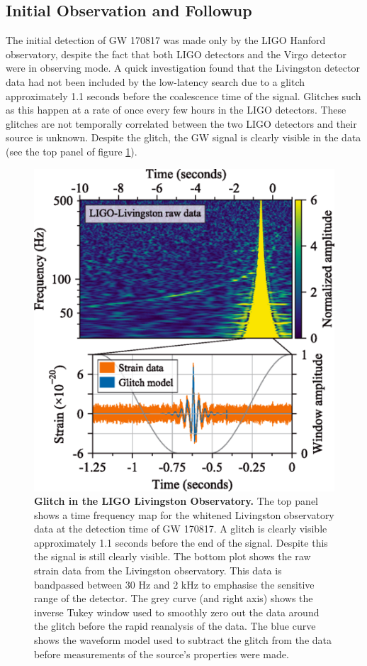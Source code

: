 \documentclass[11pt]{cuthesis}
\begin{document}
\subsection{Initial Observation and Followup}
The initial detection of GW 170817 was made only by the LIGO Hanford observatory, despite the fact that both LIGO detectors and the Virgo detector were in observing mode. A quick investigation found that the Livingston detector data had not been included by the low-latency search due to a glitch approximately 1.1 seconds before the coalescence time of the signal\cite{GW170817_det}. Glitches such as this happen at a rate of once every few hours in the LIGO detectors. These glitches are not temporally correlated between the two LIGO detectors and their source is unknown. Despite the glitch, the GW signal is clearly visible in the data (see the top panel of figure \ref{fig:l1 gltich}). 

\begin{figure} %
\begin{center}
\includegraphics[width=0.8\linewidth]{l1_glitch.png}
\end{center}
\caption{\textbf{Glitch in the LIGO Livingston Observatory.} The top panel shows a time frequency map for the whitened Livingston observatory data at the detection time of GW 170817. A glitch is clearly visible approximately 1.1 seconds before the end of the signal. Despite this the signal is still clearly visible. The bottom plot shows the raw strain data from the Livingston observatory. This data is bandpassed between 30 Hz and 2 kHz to emphasise the sensitive range of the detector. The grey curve (and right axis) shows the inverse Tukey window used to smoothly zero out the data around the glitch before the rapid reanalysis of the data. The blue curve shows the waveform model used to subtract the glitch from the data before measurements of the source's properties were made. \cite{GW170817_det} }
\label{fig:l1 gltich}
\end{figure}
\end{document}
